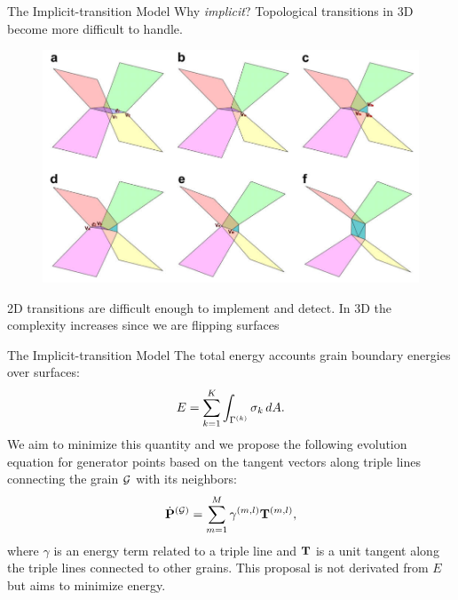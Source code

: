 \documentclass[usenames,dvipsnames]{beamer}
\begin{document}
\begin{frame}{The Implicit-transition Model}
    Why \emph{implicit}? Topological transitions in 3D become more difficult to handle.
    \begin{figure}
        \centering
        \includegraphics[scale=0.25]{figures/extras/3dflipping.png}
    \end{figure}
    2D transitions are difficult enough to implement and detect. In 3D the complexity increases since we are flipping surfaces~\cite{BarralesMora2008}
\end{frame}


\begin{frame}{The Implicit-transition Model}
    The total energy accounts grain boundary energies over surfaces:
    \begin{equation*}
        E = \sum_{k=1}^{K} \int_{\Gamma^{(k)}} \sigma_k\,dA.
    \end{equation*}
We aim to minimize this quantity and we propose the following evolution equation for generator points based on the tangent vectors along triple lines connecting the grain $\mathcal{G}$ with its neighbors:
\begin{equation*}
    \dot{\mathbf{P}}^{(\mathcal{G})} = \sum_{m=1}^{M} \gamma^{(m,l)}\mathbf{T}^{(m,l)},
\end{equation*}
where $\gamma$ is an energy term related to a triple line and $\mathbf{T}$ is a unit tangent along the triple lines connected to other grains. This proposal is not derivated from $E$ but aims to minimize energy.\\
\end{frame}
\end{document}
